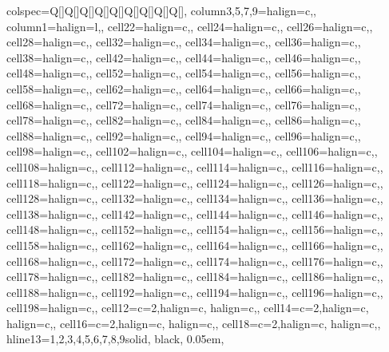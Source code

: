 \begin{table}
\centering
\begin{talltblr}[         %
entry=none,label=none,
note{}={+ p \num{< 0.1}, * p \num{< 0.05}, ** p \num{< 0.01}, *** p \num{< 0.001}},
]                     %
{                     %
colspec={Q[]Q[]Q[]Q[]Q[]Q[]Q[]Q[]Q[]},
column{3,5,7,9}={}{halign=c,},
column{1}={}{halign=l,},
cell{2}{2}={}{halign=c,},
cell{2}{4}={}{halign=c,},
cell{2}{6}={}{halign=c,},
cell{2}{8}={}{halign=c,},
cell{3}{2}={}{halign=c,},
cell{3}{4}={}{halign=c,},
cell{3}{6}={}{halign=c,},
cell{3}{8}={}{halign=c,},
cell{4}{2}={}{halign=c,},
cell{4}{4}={}{halign=c,},
cell{4}{6}={}{halign=c,},
cell{4}{8}={}{halign=c,},
cell{5}{2}={}{halign=c,},
cell{5}{4}={}{halign=c,},
cell{5}{6}={}{halign=c,},
cell{5}{8}={}{halign=c,},
cell{6}{2}={}{halign=c,},
cell{6}{4}={}{halign=c,},
cell{6}{6}={}{halign=c,},
cell{6}{8}={}{halign=c,},
cell{7}{2}={}{halign=c,},
cell{7}{4}={}{halign=c,},
cell{7}{6}={}{halign=c,},
cell{7}{8}={}{halign=c,},
cell{8}{2}={}{halign=c,},
cell{8}{4}={}{halign=c,},
cell{8}{6}={}{halign=c,},
cell{8}{8}={}{halign=c,},
cell{9}{2}={}{halign=c,},
cell{9}{4}={}{halign=c,},
cell{9}{6}={}{halign=c,},
cell{9}{8}={}{halign=c,},
cell{10}{2}={}{halign=c,},
cell{10}{4}={}{halign=c,},
cell{10}{6}={}{halign=c,},
cell{10}{8}={}{halign=c,},
cell{11}{2}={}{halign=c,},
cell{11}{4}={}{halign=c,},
cell{11}{6}={}{halign=c,},
cell{11}{8}={}{halign=c,},
cell{12}{2}={}{halign=c,},
cell{12}{4}={}{halign=c,},
cell{12}{6}={}{halign=c,},
cell{12}{8}={}{halign=c,},
cell{13}{2}={}{halign=c,},
cell{13}{4}={}{halign=c,},
cell{13}{6}={}{halign=c,},
cell{13}{8}={}{halign=c,},
cell{14}{2}={}{halign=c,},
cell{14}{4}={}{halign=c,},
cell{14}{6}={}{halign=c,},
cell{14}{8}={}{halign=c,},
cell{15}{2}={}{halign=c,},
cell{15}{4}={}{halign=c,},
cell{15}{6}={}{halign=c,},
cell{15}{8}={}{halign=c,},
cell{16}{2}={}{halign=c,},
cell{16}{4}={}{halign=c,},
cell{16}{6}={}{halign=c,},
cell{16}{8}={}{halign=c,},
cell{17}{2}={}{halign=c,},
cell{17}{4}={}{halign=c,},
cell{17}{6}={}{halign=c,},
cell{17}{8}={}{halign=c,},
cell{18}{2}={}{halign=c,},
cell{18}{4}={}{halign=c,},
cell{18}{6}={}{halign=c,},
cell{18}{8}={}{halign=c,},
cell{19}{2}={}{halign=c,},
cell{19}{4}={}{halign=c,},
cell{19}{6}={}{halign=c,},
cell{19}{8}={}{halign=c,},
cell{1}{2}={c=2,}{halign=c, halign=c,},
cell{1}{4}={c=2,}{halign=c, halign=c,},
cell{1}{6}={c=2,}{halign=c, halign=c,},
cell{1}{8}={c=2,}{halign=c, halign=c,},
hline{13}={1,2,3,4,5,6,7,8,9}{solid, black, 0.05em},
}                     %

\end{talltblr}
\end{table}
